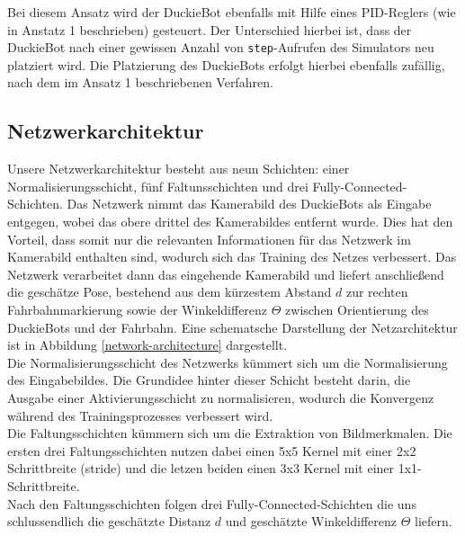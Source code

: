 Bei diesem Ansatz wird der DuckieBot ebenfalls mit Hilfe eines PID-Reglers (wie in Anstatz 1 beschrieben) gesteuert. Der Unterschied hierbei ist, dass der DuckieBot nach einer gewissen Anzahl von \texttt{step}-Aufrufen des Simulators neu platziert wird. Die Platzierung des DuckieBots erfolgt hierbei ebenfalls zufällig, nach dem im Ansatz 1 beschriebenen Verfahren. 

\subsection{Netzwerkarchitektur}

Unsere Netzwerkarchitektur besteht aus neun Schichten: einer Normalisierungsschicht, fünf Faltunsschichten und drei Fully-Connected-Schichten. Das Netzwerk nimmt das  Kamerabild des DuckieBots als Eingabe entgegen, wobei das obere drittel des Kamerabildes entfernt wurde. Dies hat den Vorteil, dass somit nur die relevanten Informationen für das Netzwerk im Kamerabild enthalten sind, wodurch sich das Training des Netzes verbessert. Das Netzwerk verarbeitet dann das eingehende Kamerabild und liefert anschließend die geschätze Pose, bestehend aus dem kürzestem Abstand $d$ zur rechten Fahrbahnmarkierung sowie der Winkeldifferenz $\Theta$ zwischen Orientierung des DuckieBots und der Fahrbahn.
Eine schematsche Darstellung der Netzarchitektur ist in Abbildung \ref{network-architecture} dargestellt. \\

Die Normalisierungsschicht des Netzwerks kümmert sich um die Normalisierung des Eingabebildes. Die Grundidee hinter dieser Schicht besteht darin, die Ausgabe einer Aktivierungsschicht zu normalisieren, wodurch die Konvergenz während des Trainingsprozesses verbessert wird. \cite{tensorflow} \\

Die Faltungsschichten kümmern sich um die Extraktion von Bildmerkmalen. Die ersten drei Faltungsschichten nutzen dabei einen 5x5 Kernel mit einer 2x2 Schrittbreite (stride) und die letzen beiden einen 3x3 Kernel mit einer 1x1-Schrittbreite. \\

Nach den Faltungsschichten folgen drei Fully-Connected-Schichten die uns schlussendlich die geschätzte Distanz $d$ und geschätzte Winkeldifferenz $\Theta$ liefern.


